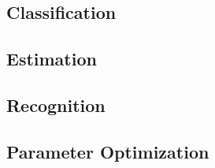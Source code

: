 \subsection{Classification}

\subsection{Estimation}

\subsection{Recognition}

\subsection{Parameter Optimization}


